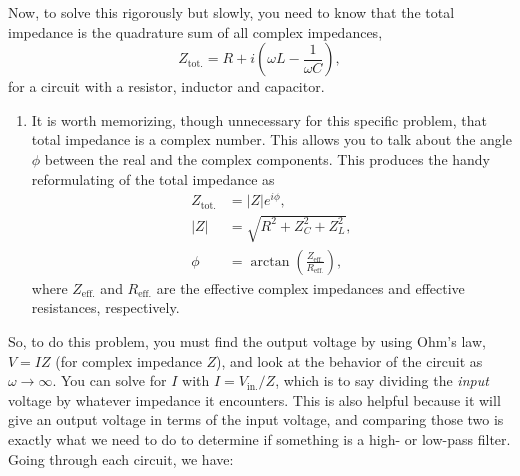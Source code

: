 \documentclass[11pt]{paper}
\begin{document}
Now, to solve this rigorously but slowly, you need to know that the total impedance is the quadrature sum of all complex impedances,
\begin{equation}
Z_\text{tot.} = R + i\left(\omega L - \frac{1}{\omega C}\right),
\end{equation}
for a circuit with a resistor, inductor and capacitor.  
\begin{enumerate}[label=*]
\item It is worth memorizing, though unnecessary for this specific problem, that total impedance is a complex number.  This allows you to talk about the angle $\phi$ between the real and the complex components.  This produces the handy reformulating of the total impedance as
\begin{align}
Z_\text{tot.} &= \left|Z\right|e^{i\phi},\\
\left|Z\right|&=\sqrt{R^2 + Z_C^2 + Z_L^2},\\
\phi &= \arctan \left( \frac{Z_\text{eff.}}{R_\text{eff.}}\right),
\end{align}
where $Z_\text{eff.}$ and $R_\text{eff.}$ are the effective complex impedances and effective resistances, respectively.
\end{enumerate}
So, to do this problem, you must find the output voltage by using Ohm's law, $V = IZ$ (for complex impedance $Z$), and look at the behavior of the circuit as $\omega \rightarrow \infty$.  You can solve for $I$ with $I = V_\text{in.}/Z$, which is to say dividing the \emph{input} voltage by whatever impedance it encounters.  This is also helpful because it will give an output voltage in terms of the input voltage, and comparing those two is exactly what we need to do to determine if something is a high- or low-pass filter.  Going through each circuit, we have:
\end{document}
